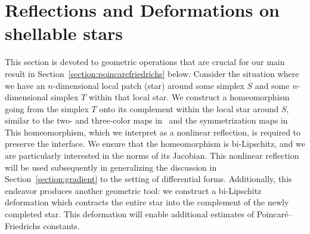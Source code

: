 \documentclass[10pt,a4paper]{article}
\begin{document}
 




















 
 
 
 
 
 
 
 
 
 
 
 
 
 
 
 
 
 
 
 
 
 
 
 
\section{Reflections and Deformations on shellable stars}\label{section:extension}

This section is devoted to geometric operations that are crucial for our main result in Section~\ref{section:poincarefriedrichs} below. 
Consider the situation where we have an $n$-dimensional local patch (star) around some simplex $S$ and some $n$-dimensional simplex $T$ within that local star. 
We construct a homeomorphism going from the simplex $T$ onto its complement within the local star around $S$,
similar to the two- and three-color maps in~\cite[Sections~5.3 and~6.3]{ern2020stable} and the symmetrization maps in~\cite[Section~7.6]{Chaum_Voh_p_rob_3D_H_curl_24}
This homeomorphism, which we interpret as a nonlinear reflection, is required to preserve the interface. 
We ensure that the homeomorphism is bi-Lipschitz, and we are particularly interested in the norms of its Jacobian.
This nonlinear reflection will be used subsequently in generalizing the discussion in Section~\ref{section:gradient} to the setting of differential forms. 
Additionally, this endeavor produces another geometric tool:
we construct a bi-Lipschitz deformation which contracts the entire star into the complement of the newly completed star. 
This deformation will enable additional estimates of Poincar\'e--Friedrichs constants. 
\end{document}
